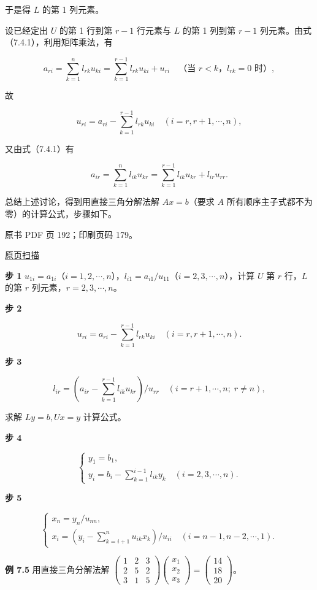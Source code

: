 于是得 \(L\) 的第 1 列元素。

设已经定出 \(U\) 的第 1 行到第 \(r-1\) 行元素与 \(L\) 的第 1 列到第 \(r-1\) 列元素。由式（7.4.1），利用矩阵乘法，有

\[a_{ri}=\sum_{k=1}^{n}l_{rk}u_{ki}=\sum_{k=1}^{r-1}l_{rk}u_{ki}+u_{ri}\quad\text{（当 $r<k$，$l_{rk}=0$ 时）},\]

故

\[u_{ri}=a_{ri}-\sum_{k=1}^{r-1}l_{rk}u_{ki}\quad(i=r,r+1,\cdots,n),\]

又由式（7.4.1）有

\[a_{ir}=\sum_{k=1}^{n}l_{ik}u_{kr}=\sum_{k=1}^{r-1}l_{ik}u_{kr}+l_{ir}u_{rr}.\]

总结上述讨论，得到用直接三角分解法解 \(Ax=b\)（要求 \(A\) 所有顺序主子式都不为零）的计算公式，步骤如下。

\clearpage

原书 PDF 页 192；印刷页码 179。

\href{source-images/pdf-192.jpeg}{原页扫描}

\textbf{步 1} \(u_{1i}=a_{1i}\)（\(i=1,2,\cdots,n\)），\(l_{i1}=a_{i1}/u_{11}\)（\(i=2,3,\cdots,n\)），计算 \(U\) 第 \(r\) 行，\(L\) 的第 \(r\) 列元素，\(r=2,3,\cdots,n\)。

\textbf{步 2}

\[u_{ri}=a_{ri}-\sum_{k=1}^{r-1}l_{rk}u_{ki}\quad(i=r,r+1,\cdots,n).\tag{7.4.2}\]

\textbf{步 3}

\[l_{ir}=\left(a_{ir}-\sum_{k=1}^{r-1}l_{ik}u_{kr}\right)/u_{rr}\quad(i=r+1,\cdots,n;\;r\ne n),\tag{7.4.3}\]

求解 \(Ly=b,Ux=y\) 计算公式。

\textbf{步 4}

\[
\begin{cases}
y_1=b_1,\\
y_i=\displaystyle b_i-\sum_{k=1}^{i-1}l_{ik}y_k\quad(i=2,3,\cdots,n).
\end{cases}
\tag{7.4.4}
\]

\textbf{步 5}

\[
\begin{cases}
x_n=y_n/u_{nn},\\
x_i=\displaystyle\left(y_i-\sum_{k=i+1}^{n}u_{ik}x_k\right)/u_{ii}\quad(i=n-1,n-2,\cdots,1).
\end{cases}
\tag{7.4.5}
\]

\textbf{例 7.5} 用直接三角分解法解 \(\begin{pmatrix}1&2&3\\2&5&2\\3&1&5\end{pmatrix}\begin{pmatrix}x_1\\x_2\\x_3\end{pmatrix}=\begin{pmatrix}14\\18\\20\end{pmatrix}\)。

